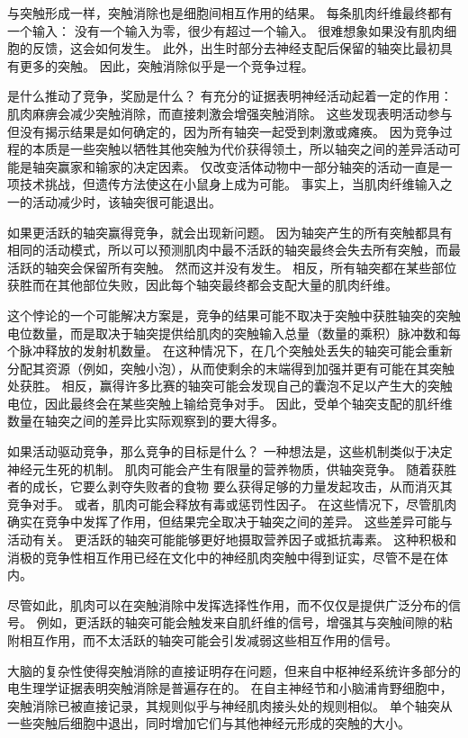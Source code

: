 与突触形成一样，突触消除也是细胞间相互作用的结果。
每条肌肉纤维最终都有一个输入：
没有一个输入为零，很少有超过一个输入。
很难想象如果没有肌肉细胞的反馈，这会如何发生。
此外，出生时部分去神经支配后保留的轴突比最初具有更多的突触。
因此，突触消除似乎是一个竞争过程。


是什么推动了竞争，奖励是什么？
有充分的证据表明神经活动起着一定的作用：
肌肉麻痹会减少突触消除，而直接刺激会增强突触消除。
这些发现表明活动参与但没有揭示结果是如何确定的，因为所有轴突一起受到刺激或瘫痪。
因为竞争过程的本质是一些突触以牺牲其他突触为代价获得领土，所以轴突之间的差异活动可能是轴突赢家和输家的决定因素。
仅改变活体动物中一部分轴突的活动一直是一项技术挑战，但遗传方法使这在小鼠身上成为可能。
事实上，当肌肉纤维输入之一的活动减少时，该轴突很可能退出。


如果更活跃的轴突赢得竞争，就会出现新问题。
因为轴突产生的所有突触都具有相同的活动模式，所以可以预测肌肉中最不活跃的轴突最终会失去所有突触，而最活跃的轴突会保留所有突触。
然而这并没有发生。
相反，所有轴突都在某些部位获胜而在其他部位失败，因此每个轴突最终都会支配大量的肌肉纤维。


这个悖论的一个可能解决方案是，竞争的结果可能不取决于突触中获胜轴突的突触电位数量，而是取决于轴突提供给肌肉的突触输入总量（数量的乘积）脉冲数和每个脉冲释放的发射机数量。
在这种情况下，在几个突触处丢失的轴突可能会重新分配其资源（例如，突触小泡），从而使剩余的末端得到加强并更有可能在其突触处获胜。
相反，赢得许多比赛的轴突可能会发现自己的囊泡不足以产生大的突触电位，因此最终会在某些突触上输给竞争对手。
因此，受单个轴突支配的肌纤维数量在轴突之间的差异比实际观察到的要大得多。


如果活动驱动竞争，那么竞争的目标是什么？
一种想法是，这些机制类似于决定神经元生死的机制。
肌肉可能会产生有限量的营养物质，供轴突竞争。
随着获胜者的成长，它要么剥夺失败者的食物
要么获得足够的力量发起攻击，从而消灭其竞争对手。 或者，肌肉可能会释放有毒或惩罚性因子。
在这些情况下，尽管肌肉确实在竞争中发挥了作用，但结果完全取决于轴突之间的差异。
这些差异可能与活动有关。
更活跃的轴突可能能够更好地摄取营养因子或抵抗毒素。
这种积极和消极的竞争性相互作用已经在文化中的神经肌肉突触中得到证实，尽管不是在体内。


尽管如此，肌肉可以在突触消除中发挥选择性作用，而不仅仅是提供广泛分布的信号。
例如，更活跃的轴突可能会触发来自肌纤维的信号，增强其与突触间隙的粘附相互作用，而不太活跃的轴突可能会引发减弱这些相互作用的信号。


大脑的复杂性使得突触消除的直接证明存在问题，但来自中枢神经系统许多部分的电生理学证据表明突触消除是普遍存在的。
在自主神经节和小脑浦肯野细胞中，突触消除已被直接记录，其规则似乎与神经肌肉接头处的规则相似。
单个轴突从一些突触后细胞中退出，同时增加它们与其他神经元形成的突触的大小。



